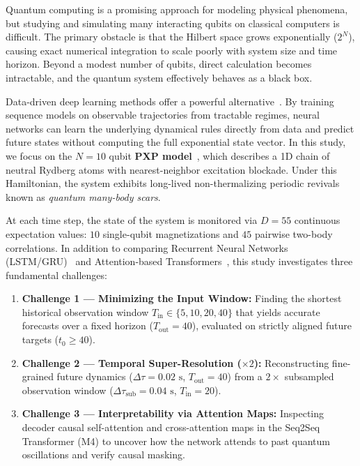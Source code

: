 \documentclass[10pt,a4paper]{article}
\begin{document}
Quantum computing is a promising approach for modeling physical phenomena, but studying and simulating many interacting qubits on classical computers is difficult. The primary obstacle is that the Hilbert space grows exponentially ($2^N$), causing exact numerical integration to scale poorly with system size and time horizon. Beyond a modest number of qubits, direct calculation becomes intractable, and the quantum system effectively behaves as a black box.

Data-driven deep learning methods offer a powerful alternative~\cite{carleo2017}. By training sequence models on observable trajectories from tractable regimes, neural networks can learn the underlying dynamical rules directly from data and predict future states without computing the full exponential state vector. In this study, we focus on the $N = 10$ qubit \textbf{PXP model}~\cite{bernien2017}, which describes a 1D chain of neutral Rydberg atoms with nearest-neighbor excitation blockade. Under this Hamiltonian, the system exhibits long-lived non-thermalizing periodic revivals known as \emph{quantum many-body scars}.

At each time step, the state of the system is monitored via $D = 55$ continuous expectation values: $10$ single-qubit magnetizations and $45$ pairwise two-body correlations. In addition to comparing Recurrent Neural Networks (LSTM/GRU)~\cite{sutskever2014} and Attention-based Transformers~\cite{vaswani2017}, this study investigates three fundamental challenges:
\begin{enumerate}[leftmargin=*, itemsep=1.5pt, topsep=2pt]
    \item \textbf{Challenge 1 --- Minimizing the Input Window:} Finding the shortest historical observation window $T_{\text{in}} \in \{5, 10, 20, 40\}$ that yields accurate forecasts over a fixed horizon ($T_{\text{out}} = 40$), evaluated on strictly aligned future targets ($t_0 \ge 40$).
    \item \textbf{Challenge 2 --- Temporal Super-Resolution ($\times 2$):} Reconstructing fine-grained future dynamics ($\Delta \tau = 0.02\text{ s}$, $T_{\text{out}} = 40$) from a $2\times$ subsampled observation window ($\Delta \tau_{\text{sub}} = 0.04\text{ s}$, $T_{\text{in}} = 20$).
    \item \textbf{Challenge 3 --- Interpretability via Attention Maps:} Inspecting decoder causal self-attention and cross-attention maps in the Seq2Seq Transformer (M4) to uncover how the network attends to past quantum oscillations and verify causal masking.
\end{enumerate}
\end{document}
